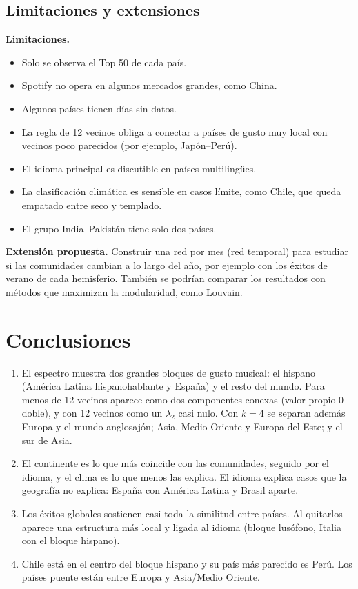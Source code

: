 \documentclass[11pt,a4paper]{article}
\begin{document}
\subsection{Limitaciones y extensiones}

\textbf{Limitaciones.}
\begin{itemize}[leftmargin=1.5em]
\item Solo se observa el Top 50 de cada país.
\item Spotify no opera en algunos mercados grandes, como China.
\item Algunos países tienen días sin datos.
\item La regla de 12 vecinos obliga a conectar a países de gusto muy local con vecinos poco parecidos (por ejemplo, Japón–Perú).
\item El idioma principal es discutible en países multilingües.
\item La clasificación climática es sensible en casos límite, como Chile, que queda empatado entre seco y templado.
\item El grupo India–Pakistán tiene solo dos países.
\end{itemize}

\textbf{Extensión propuesta.} Construir una red por mes (red temporal) para estudiar si las comunidades cambian a lo largo del año, por ejemplo con los éxitos de verano de cada hemisferio. También se podrían comparar los resultados con métodos que maximizan la modularidad, como Louvain.

\section{Conclusiones}

\begin{enumerate}[leftmargin=1.5em]
\item El espectro muestra dos grandes bloques de gusto musical: el hispano (América Latina hispanohablante y España) y el resto del mundo. Para menos de 12 vecinos aparece como dos componentes conexas (valor propio $0$ doble), y con 12 vecinos como un $\lambda_2$ casi nulo. Con $k=4$ se separan además Europa y el mundo anglosajón; Asia, Medio Oriente y Europa del Este; y el sur de Asia.
\item El continente es lo que más coincide con las comunidades, seguido por el idioma, y el clima es lo que menos las explica. El idioma explica casos que la geografía no explica: España con América Latina y Brasil aparte.
\item Los éxitos globales sostienen casi toda la similitud entre países. Al quitarlos aparece una estructura más local y ligada al idioma (bloque lusófono, Italia con el bloque hispano).
\item Chile está en el centro del bloque hispano y su país más parecido es Perú. Los países puente están entre Europa y Asia/Medio Oriente.
\end{enumerate}
\end{document}
